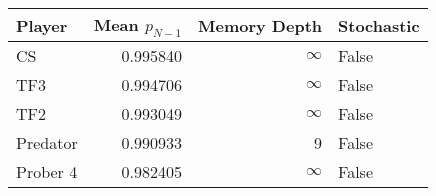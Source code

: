 \begin{tabular}{lrrl}
\toprule
   Player &  Mean $p_{N-1}$ &  Memory Depth & Stochastic \\
\midrule
       CS &        0.995840 &            \(\infty\) &      False \\
      TF3 &        0.994706 &            \(\infty\) &      False \\
      TF2 &        0.993049 &            \(\infty\) &      False \\
 Predator &        0.990933 &             9 &      False \\
 Prober 4 &        0.982405 &            \(\infty\) &      False \\
\bottomrule
\end{tabular}
